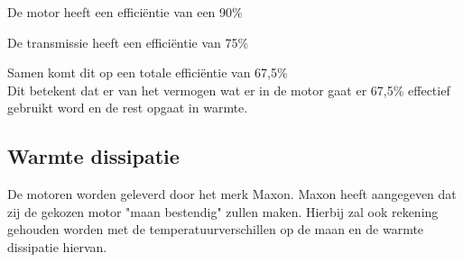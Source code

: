 De motor heeft een efficiëntie van een 90\%

De transmissie heeft een efficiëntie van 75\%

Samen komt dit op een totale efficiëntie van 67,5\% \\
Dit betekent dat er van het vermogen wat er in de motor gaat er 67,5\% effectief gebruikt word en de rest opgaat in warmte.

\subsection{Warmte dissipatie}

De motoren worden geleverd door het merk Maxon. Maxon heeft aangegeven dat zij de gekozen motor "maan bestendig" zullen maken. Hierbij zal ook rekening gehouden worden met de temperatuurverschillen op de maan en de warmte dissipatie hiervan. 